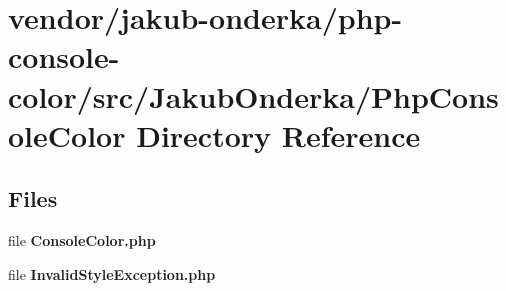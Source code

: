 \section{vendor/jakub-\/onderka/php-\/console-\/color/src/\+Jakub\+Onderka/\+Php\+Console\+Color Directory Reference}
\label{dir_f29292182603dbf34dee3ef44e186905}
\subsection*{Files}
\begin{DoxyCompactItemize}
\item 
file {\bf Console\+Color.\+php}
\item 
file {\bf Invalid\+Style\+Exception.\+php}
\end{DoxyCompactItemize}
